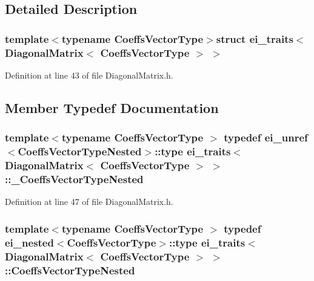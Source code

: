\subsection{Detailed Description}
\subsubsection*{template$<$typename Coeffs\-Vector\-Type$>$struct ei\-\_\-traits$<$ Diagonal\-Matrix$<$ Coeffs\-Vector\-Type $>$ $>$}



Definition at line 43 of file Diagonal\-Matrix.\-h.



\subsection{Member Typedef Documentation}
\hypertarget{structei__traits_3_01_diagonal_matrix_3_01_coeffs_vector_type_01_4_01_4_a97f9eeda885950b593d79b2e071e3658}{
\subsubsection[{\-\_\-\-Coeffs\-Vector\-Type\-Nested}]{\setlength{\rightskip}{0pt plus 5cm}template$<$typename Coeffs\-Vector\-Type $>$ typedef {\bf ei\-\_\-unref}$<${\bf Coeffs\-Vector\-Type\-Nested}$>$\-::{\bf type} {\bf ei\-\_\-traits}$<$ {\bf Diagonal\-Matrix}$<$ Coeffs\-Vector\-Type $>$ $>$\-::{\bf \-\_\-\-Coeffs\-Vector\-Type\-Nested}}}\label{structei__traits_3_01_diagonal_matrix_3_01_coeffs_vector_type_01_4_01_4_a97f9eeda885950b593d79b2e071e3658}


Definition at line 47 of file Diagonal\-Matrix.\-h.

\hypertarget{structei__traits_3_01_diagonal_matrix_3_01_coeffs_vector_type_01_4_01_4_a60ad4adeaeebca8e580ddeadd36b8256}{
\subsubsection[{Coeffs\-Vector\-Type\-Nested}]{\setlength{\rightskip}{0pt plus 5cm}template$<$typename Coeffs\-Vector\-Type $>$ typedef {\bf ei\-\_\-nested}$<$Coeffs\-Vector\-Type$>$\-::{\bf type} {\bf ei\-\_\-traits}$<$ {\bf Diagonal\-Matrix}$<$ Coeffs\-Vector\-Type $>$ $>$\-::{\bf Coeffs\-Vector\-Type\-Nested}}}\label{structei__traits_3_01_diagonal_matrix_3_01_coeffs_vector_type_01_4_01_4_a60ad4adeaeebca8e580ddeadd36b8256}


